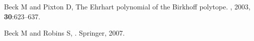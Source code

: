 \documentclass{jssc}
\begin{document}
\begin{thebibliography}{100}
  Beck M and   Pixton D,
\newblock The {E}hrhart polynomial of the {B}irkhoff polytope.
, 2003, {\bf 30}:623--637.

  Beck M and  Robins S,
  .
\newblock Springer, 2007.

\end{thebibliography}

\end{document}
